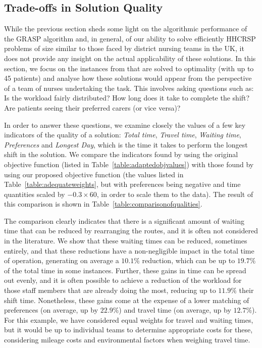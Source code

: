 \documentclass[a4paper,11pt,authoryear]{elsarticle}
\begin{document}
\subsection{Trade-offs in Solution Quality}
\label{sub:exploringobjfunction}
\noindent While the previous section sheds some light on the algorithmic performance of the GRASP algorithm and, in general, of our ability to solve efficiently HHCRSP problems of size similar to those faced by district nursing teams in the UK, it does not provide any insight on the actual applicability of these solutions. In this section, we focus on the instances from \cite{aithaddadene2016} that are solved to optimality (with up to 45 patients) and analyse how these solutions would appear from the perspective of a team of nurses undertaking the task. This involves asking questions such as: Is the workload fairly distributed? How long does it take to complete the shift? Are patients seeing their preferred carers (or vice versa)?

In order to answer these questions, we examine closely the values of a few key indicators of the quality of a solution: \emph{Total time}, \emph{Travel time}, \emph{Waiting time}, \emph{Preferences} and \emph{Longest Day}, which is the time it takes to perform the longest shift in the solution. We compare the indicators found by using the original objective function (listed in Table~\ref{table:adaptedobjvalues}) with those found by using our proposed objective function (the values listed in Table~\ref{table:adequateweights}, but with preferences being negative and time quantities scaled by $-0.3\times60$, in order to scale them to the data). The result of this comparison is shown in Table~\ref{table:comparisonofqualities}.



The comparison clearly indicates that there is a significant amount of waiting time that can be reduced by rearranging the routes, and it is often not considered in the literature. We show that these waiting times can be reduced, sometimes entirely, and that these reductions have a non-negligible impact in the total time of operation, generating on average a $10.1\%$ reduction, which can be up to $19.7\%$ of the total time in some instances. Further, these gains in time can be spread out evenly, and it is often possible to achieve a reduction of the workload for those staff members that are already doing the most, reducing up to $11.9\%$ their shift time. Nonetheless, these gains come at the expense of a lower matching of preferences (on average, up by $22.9\%$) and travel time (on average, up by $12.7\%$). For this example, we have considered equal weights for travel and waiting times, but it would be up to individual teams to determine appropriate costs for these, considering mileage costs and environmental factors when weighing travel time.
\end{document}
